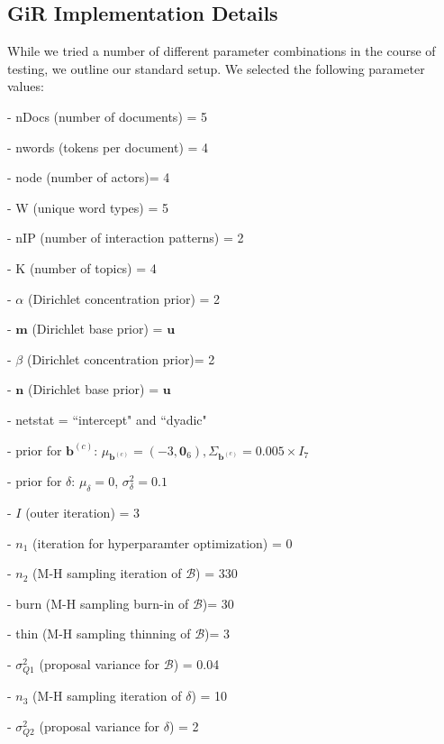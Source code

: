 \documentclass[a4paper]{article}
\begin{document}
   \subsection{GiR Implementation Details} \label{subsubsec: GiR implementation}
   While we tried a number of different parameter combinations in the course of testing, we outline our standard setup. We selected the following parameter values:
   \begin{itemize}
   	\begin{minipage}{0.5\textwidth}
   		\item[-] nDocs (number of documents) = 5
   		\item[-] nwords (tokens per document) = 4
   		\item[-] node (number of actors)= 4
   		\item[-] W (unique word types) = 5
   		\item[-] nIP (number of interaction patterns) = 2
   		\item[-] K (number of topics) = 4
   		\item[-] $\alpha$ (Dirichlet concentration prior) = 2
   		\item[-] $\boldsymbol{m}$ (Dirichlet base prior) = $\boldsymbol{u}$ 
   		\item[-] $\beta$ (Dirichlet concentration prior)= 2
   		\item[-] $\boldsymbol{n}$ (Dirichlet base prior) = $\boldsymbol{u}$
   		\item[-] netstat = ``intercept" and ``dyadic"
   	\end{minipage}
   	\begin{minipage}{0.5\textwidth}
   		\item[-] prior for $\boldsymbol{b}^{(c)}$: $\mu_{\boldsymbol{b}^{(c)}} = (-3,\boldsymbol{0}_6), \Sigma_{\boldsymbol{b}^{(c)}} = 0.005\times I_7$
   		\item[-] prior for $\delta$: $\mu_\delta = 0$, $\sigma^2_\delta = 0.1$
   		\item[-] $I$ (outer iteration) = 3
   		\item[-] $n_1$ (iteration for hyperparamter optimization) = 0
   		\item[-] $n_2$ (M-H sampling iteration of $\mathcal{B}$) = 330
   		\item[-] burn (M-H sampling burn-in of $\mathcal{B}$)= 30
   		\item[-] thin (M-H sampling thinning of $\mathcal{B}$)= 3
   		\item[-] $\sigma_{Q1}^2$ (proposal variance for $\mathcal{B}$) = 0.04
   		\item[-] $n_3$ (M-H sampling iteration of $\delta$) = 10
   		\item[-] $\sigma_{Q2}^2$ (proposal variance for $\delta$) = 2
   	\end{minipage}
   \end{itemize}
\end{document}
